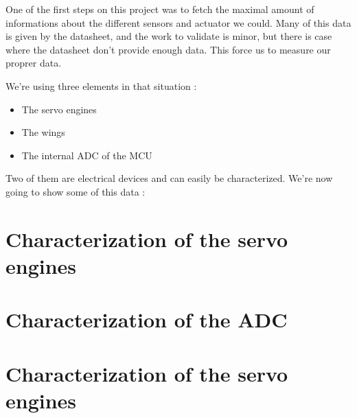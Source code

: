 One of the first steps on this project was to fetch the maximal amount of informations
about the different sensors and actuator we could.
Many of this data is given by the datasheet, and the work to validate is minor, but there 
is case where the datasheet don't provide enough data.
This force us to measure our proprer data.

We're using three elements in that situation : 
\begin{itemize}
    \item The servo engines
    \item The wings
    \item The internal ADC of the MCU
\end{itemize}

Two of them are electrical devices and can easily be characterized.
We're now going to show some of this data :

\section{Characterization of the servo engines}


\section{Characterization of the ADC}


\section{Characterization of the servo engines}


